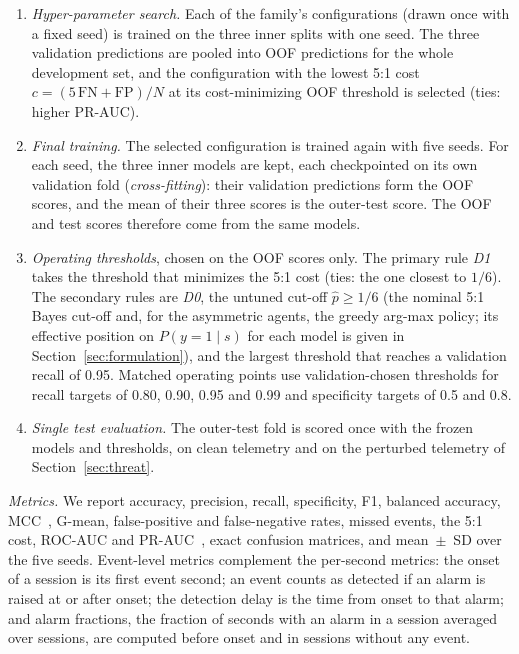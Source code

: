 \begin{enumerate}
\item \emph{Hyper-parameter search.} Each of the family's configurations (drawn once with a fixed seed) is trained on the three inner splits with one seed. The three validation predictions are pooled into OOF predictions for the whole development set, and the configuration with the lowest 5:1 cost $c=(5\,\mathrm{FN}+\mathrm{FP})/N$ at its cost-minimizing OOF threshold is selected (ties: higher PR-AUC).
\item \emph{Final training.} The selected configuration is trained again with five seeds. For each seed, the three inner models are kept, each checkpointed on its own validation fold (\emph{cross-fitting}): their validation predictions form the OOF scores, and the mean of their three scores is the outer-test score. The OOF and test scores therefore come from the same models.
\item \emph{Operating thresholds}, chosen on the OOF scores only. The primary rule \emph{D1} takes the threshold that minimizes the 5:1 cost (ties: the one closest to $1/6$). The secondary rules are \emph{D0}, the untuned cut-off $\hat p\ge1/6$ (the nominal 5:1 Bayes cut-off and, for the asymmetric agents, the greedy arg-max policy; its effective position on $P(y=1\mid s)$ for each model is given in Section~\ref{sec:formulation}), and the largest threshold that reaches a validation recall of 0.95. Matched operating points use validation-chosen thresholds for recall targets of 0.80, 0.90, 0.95 and 0.99 and specificity targets of 0.5 and 0.8.
\item \emph{Single test evaluation.} The outer-test fold is scored once with the frozen models and thresholds, on clean telemetry and on the perturbed telemetry of Section~\ref{sec:threat}.
\end{enumerate}

\emph{Metrics.} We report accuracy, precision, recall, specificity, F1, balanced accuracy, MCC~\cite{chicco2020mcc}, G-mean, false-positive and false-negative rates, missed events, the 5:1 cost, ROC-AUC and PR-AUC~\cite{saito2015pr}, exact confusion matrices, and mean~$\pm$~SD over the five seeds. Event-level metrics complement the per-second metrics: the onset of a session is its first event second; an event counts as detected if an alarm is raised at or after onset; the detection delay is the time from onset to that alarm; and alarm fractions, the fraction of seconds with an alarm in a session averaged over sessions, are computed before onset and in sessions without any event.

